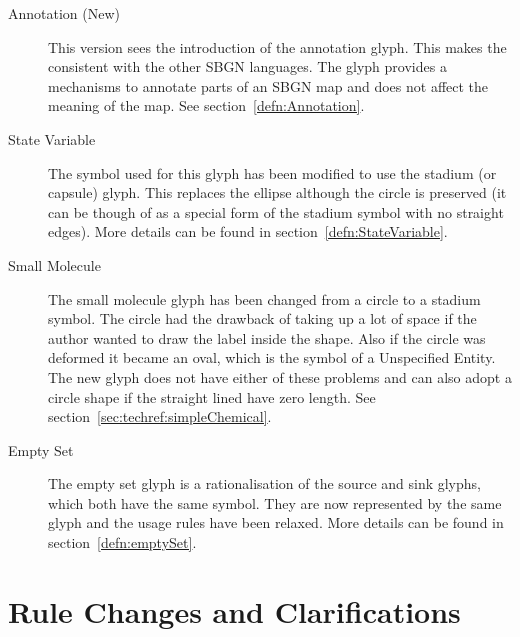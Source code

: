 \begin{description}
\item[Annotation (New)] This version sees the introduction of the annotation glyph. This makes the \PDl consistent with the other SBGN languages. The glyph provides a mechanisms to annotate parts of an SBGN map and does not affect the meaning of the map. See section~\ref{defn:Annotation}.
\item[State Variable] The symbol used for this glyph has been modified to use the stadium (or capsule) glyph. This replaces the ellipse although the circle is preserved (it can be though of as a special form of the stadium symbol with no straight edges). More details can be found in section~\ref{defn:StateVariable}.
\item[Small Molecule] The small molecule glyph has been changed from a circle to a stadium symbol. The circle had the drawback of taking up a lot of space if the author wanted to draw the label inside the shape. Also if the circle was deformed it became an oval, which is the symbol of a Unspecified Entity. The new glyph does not have either of these problems and can also adopt a circle shape if the straight lined have zero length. See section~\ref{sec:techref:simpleChemical}.
\item[Empty Set] The empty set glyph is a rationalisation of the source and sink glyphs, which both have the same symbol. They are now represented by the same glyph and the usage rules have been relaxed. More details can be found in section~\ref{defn:emptySet}.
\end{description}


\section{Rule Changes and Clarifications}


